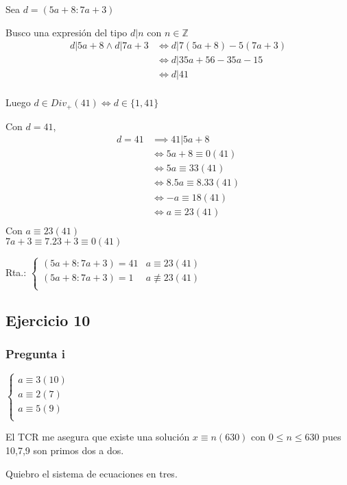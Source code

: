 Sea $ d = (5a+8:7a+3) $

Busco una expresión del tipo $ d|n $ con $ n \in \mathbb{Z} $
\begin{align*}
    d|5a+8 \wedge d|7a+3 &\iff d|7(5a+8) - 5(7a+3) \\
    &\iff d|35a+56-35a-15 \\
    &\iff d|41 \\
\end{align*}

Luego $ d \in Div_+(41) \iff d \in \{ 1,41 \} $

Con $ d = 41 $,
\begin{align*}
    d = 41 &\implies 41|5a+8 \\
    &\iff 5a+8 \equiv 0 (41) \\
    &\iff 5a\equiv 33 (41) \\
    &\iff 8.5a\equiv 8.33 (41) \\
    &\iff -a\equiv 18 (41) \\
    &\iff a\equiv 23 (41) \\
\end{align*}
Con $ a\equiv 23(41) $ \\
$ 7a+3 \equiv 7.23+3 \equiv 0(41) $

Rta.: $ \begin{cases}
    (5a+8:7a+3) = 41 & a\equiv 23(41) \\
    (5a+8:7a+3) = 1 & a \not \equiv 23(41) \\
\end{cases} $

\subsection{Ejercicio 10}

\subsubsection{Pregunta i}

$ \begin{cases}
    a\equiv 3(10) \\
    a\equiv 2(7) \\
    a\equiv 5(9) \\
\end{cases} $

El TCR me asegura que existe una solución $ x\equiv n (630) $ con $ 0\leq n \leq 630 $ pues 10,7,9 son primos dos a dos.

Quiebro el sistema de ecuaciones en tres.

